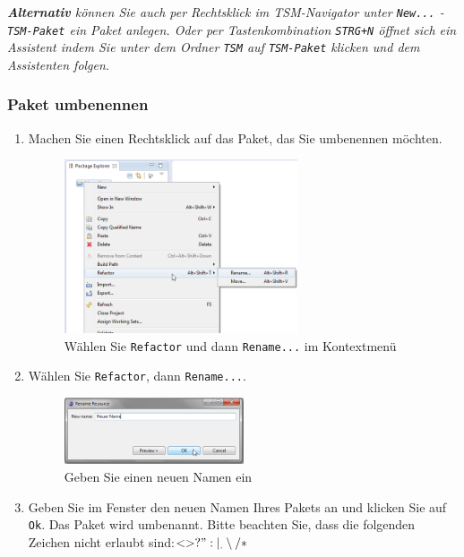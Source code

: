 \documentclass[11pt,a4paper,titlepage]{article}
\begin{document}
\textit{\textbf{Alternativ} können Sie auch per Rechtsklick im TSM-Navigator unter \texttt{New...} - \texttt{TSM-Paket} ein Paket anlegen.
Oder per Tastenkombination \texttt{STRG+N} öffnet sich ein Assistent indem Sie unter dem Ordner \texttt{TSM} auf \texttt{TSM-Paket} klicken und dem Assistenten folgen.}

\subsubsection{Paket umbenennen}
\begin{enumerate}
\item Machen Sie einen Rechtsklick auf das Paket, das Sie umbenennen möchten.

\begin{figure}[H]
\centering
\includegraphics[width= 260px]{BilderHandbuch/UmbenennenR.png}
\caption{Wählen Sie \texttt{Refactor} und dann \texttt{Rename...} im Kontextmenü}
\label{fig:UmbenennenR}
\end{figure}

\item Wählen Sie \texttt{Refactor}, dann \texttt{Rename...}.

\begin{figure}[H]
\centering
\includegraphics[width= 200px]{BilderHandbuch/UmbenennenFenster.png}
\caption{Geben Sie einen neuen Namen ein}
\label{fig:UmbenennenFenster}
\end{figure}

\item Geben Sie im Fenster den neuen Namen Ihres Pakets an und klicken Sie auf \texttt{Ok}. Das Paket wird umbenannt.
Bitte beachten Sie, dass die folgenden Zeichen nicht erlaubt sind:$ < > ? " : | _ . \setminus / *$
\end{enumerate}
\end{document}
